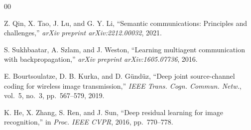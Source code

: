 \documentclass[conference]{IEEEtran}
\begin{document}
\begin{thebibliography}{00}

Z. Qin, X. Tao, J. Lu, and G. Y. Li,
``Semantic communications: Principles and challenges,''
\textit{arXiv preprint arXiv:2212.00032}, 2021.

S. Sukhbaatar, A. Szlam, and J. Weston,
``Learning multiagent communication with backpropagation,''
\textit{arXiv preprint arXiv:1605.07736}, 2016.

E. Bourtsoulatze, D. B. Kurka, and D. G\"{u}nd\"{u}z,
``Deep joint source-channel coding for wireless image transmission,''
\textit{IEEE Trans. Cogn. Commun. Netw.}, vol.~5, no.~3, pp.~567--579, 2019.

K. He, X. Zhang, S. Ren, and J. Sun,
``Deep residual learning for image recognition,''
in \textit{Proc. IEEE CVPR}, 2016, pp.~770--778.

\end{thebibliography}
\end{document}

